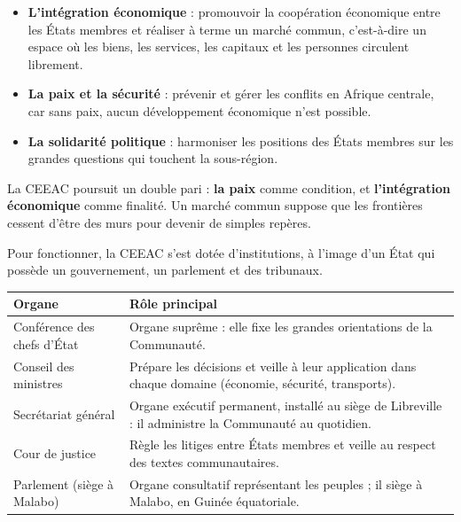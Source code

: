 \documentclass[11pt]{article}
\newcommand{\cle}[1]{{\popxbold\color{popdark}#1}}
\newcounter{popsec}
\newcounter{popsub}
\newcommand{\courssub}[1]{%
  \stepcounter{popsub}%
  \par\vspace{9pt}\noindent{\popxbold\fontsize{11.5}{13}\selectfont\color{popink}{\color{poporange}\thepopsec.\thepopsub}\hspace{6pt}#1}\par\nopagebreak\vspace{4pt}
}
\begin{document}
\begin{itemize}
\item \textbf{L'intégration économique} : promouvoir la coopération économique entre les États membres et réaliser à terme un \cle{marché commun}, c'est-à-dire un espace où les biens, les services, les capitaux et les personnes circulent librement.
\item \textbf{La paix et la sécurité} : prévenir et gérer les conflits en Afrique centrale, car sans paix, aucun développement économique n'est possible.
\item \textbf{La solidarité politique} : harmoniser les positions des États membres sur les grandes questions qui touchent la sous-région.
\end{itemize}

\begin{aretenir}
La CEEAC poursuit un double pari : \textbf{la paix} comme condition, et \textbf{l'intégration économique} comme finalité. Un marché commun suppose que les frontières cessent d'être des murs pour devenir de simples repères.
\end{aretenir}

\courssub{Les organes de la CEEAC}

Pour fonctionner, la CEEAC s'est dotée d'institutions, à l'image d'un État qui possède un gouvernement, un parlement et des tribunaux.

\begin{center}
\begin{tabularx}{\linewidth}{|l|X|}
\hline
\rowcolor{popblueL} \textbf{Organe} & \textbf{Rôle principal} \\
\hline
Conférence des chefs d'État & Organe suprême : elle fixe les grandes orientations de la Communauté. \\
\hline
Conseil des ministres & Prépare les décisions et veille à leur application dans chaque domaine (économie, sécurité, transports). \\
\hline
Secrétariat général & Organe exécutif permanent, installé au siège de Libreville : il administre la Communauté au quotidien. \\
\hline
Cour de justice & Règle les litiges entre États membres et veille au respect des textes communautaires. \\
\hline
Parlement (siège à Malabo) & Organe consultatif représentant les peuples ; il siège à Malabo, en Guinée équatoriale. \\
\hline
\end{tabularx}
\end{center}
\end{document}
